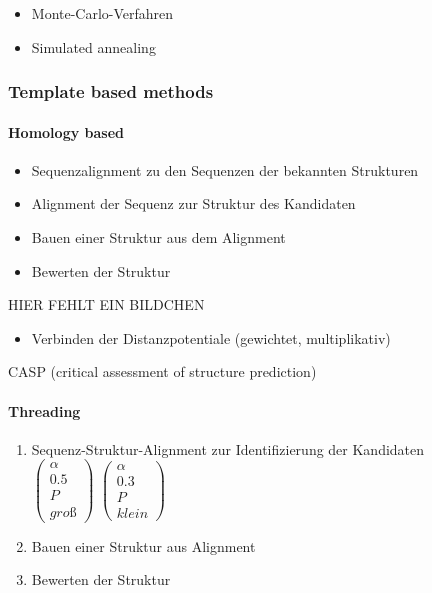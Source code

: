 \begin{itemize}
 \item Monte-Carlo-Verfahren
 \item Simulated annealing
\end{itemize}

\subsubsection{Template based methods}
\paragraph{Homology based}
\begin{itemize}
 \item Sequenzalignment zu den Sequenzen der bekannten Strukturen
 \item Alignment der Sequenz zur Struktur des Kandidaten
 \item Bauen einer Struktur aus dem Alignment
 \item Bewerten der Struktur
\end{itemize}

HIER FEHLT EIN BILDCHEN

\begin{itemize}
 \item Verbinden der Distanzpotentiale (gewichtet, multiplikativ)
\end{itemize}
CASP (critical assessment of structure prediction)

\paragraph{Threading}
\begin{enumerate}
  \item Sequenz-Struktur-Alignment zur Identifizierung der Kandidaten\\
  $\left(\begin{array}{c} \alpha \\ 0.5 \\ P \\ groß \end{array}\right)$
  $\left(\begin{array}{c} \alpha \\ 0.3 \\ P \\ klein \end{array}\right)$
  \item Bauen einer Struktur aus Alignment
  \item Bewerten der Struktur
\end{enumerate}